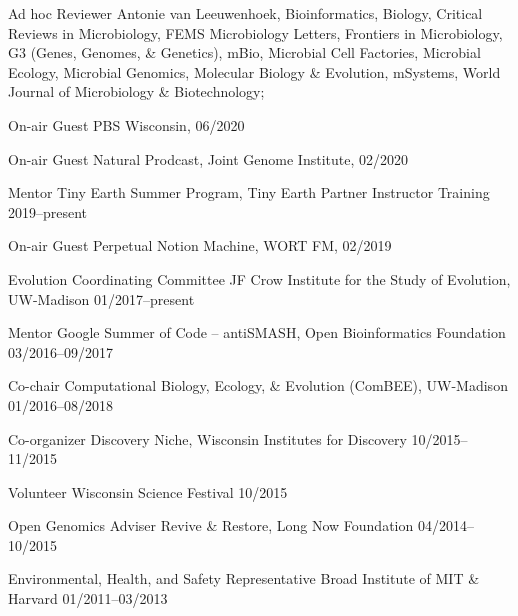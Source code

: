 

\begin{cvhonors}

\cvhonor
{Ad hoc Reviewer}
{Antonie van Leeuwenhoek, Bioinformatics, Biology, Critical Reviews in Microbiology, FEMS Microbiology Letters, Frontiers in Microbiology, G3 (Genes, Genomes, \& Genetics), mBio, Microbial Cell Factories, Microbial Ecology, Microbial Genomics, Molecular Biology \& Evolution, mSystems, World Journal of Microbiology \& Biotechnology; \textbf{\textit{}}}
{}

\cvhonor
{On-air Guest}
{PBS Wisconsin, \textbf{\textit{}}}
{06/2020}

\cvhonor
{On-air Guest}
{Natural Prodcast, Joint Genome Institute, \textbf{\textit{}}}
{02/2020}

\cvhonor
{Mentor}
{Tiny Earth Summer Program, Tiny Earth Partner Instructor Training}
{2019--present}

\cvhonor
{On-air Guest}
{Perpetual Notion Machine, WORT FM, \textbf{\textit{}}}
{02/2019}

\end{cvhonors} \begin{cvhonors}

\cvhonor
{Evolution Coordinating Committee}
{JF Crow Institute for the Study of Evolution, UW-Madison}
{01/2017--present}

\cvhonor
{Mentor}
{Google Summer of Code -- antiSMASH, Open Bioinformatics Foundation}
{03/2016--09/2017}

\cvhonor
{Co-chair}
{Computational Biology, Ecology, \& Evolution (ComBEE), UW-Madison}
{01/2016--08/2018}

\cvhonor
{Co-organizer}
{Discovery Niche, Wisconsin Institutes for Discovery}
{10/2015--11/2015}

\cvhonor
{Volunteer}
{Wisconsin Science Festival}
{10/2015}

\cvhonor
{Open Genomics Adviser}
{Revive \& Restore, Long Now Foundation}
{04/2014--10/2015}

\cvhonor
{Environmental, Health, and Safety Representative}
{Broad Institute of MIT \& Harvard}
{01/2011--03/2013}

\end{cvhonors}